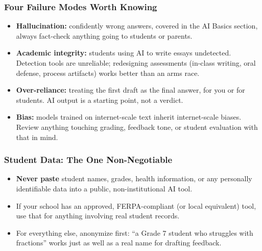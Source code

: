 \begin{frame}[fragile]\frametitle{Four Failure Modes Worth Knowing}
\begin{itemize}
\item \textbf{Hallucination:} confidently wrong answers, covered in the AI Basics section, always fact-check anything going to students or parents.
\item \textbf{Academic integrity:} students using AI to write essays undetected. Detection tools are unreliable; redesigning assessments (in-class writing, oral defense, process artifacts) works better than an arms race.
\item \textbf{Over-reliance:} treating the first draft as the final answer, for you or for students. AI output is a starting point, not a verdict.
\item \textbf{Bias:} models trained on internet-scale text inherit internet-scale biases. Review anything touching grading, feedback tone, or student evaluation with that in mind.
\end{itemize}
\end{frame}

\begin{frame}[fragile]\frametitle{Student Data: The One Non-Negotiable}
\begin{itemize}
\item \textbf{Never paste} student names, grades, health information, or any personally identifiable data into a public, non-institutional AI tool.
\item If your school has an approved, FERPA-compliant (or local equivalent) tool, use that for anything involving real student records.
\item For everything else, anonymize first: ``a Grade 7 student who struggles with fractions'' works just as well as a real name for drafting feedback.
\end{itemize}
\end{frame}

